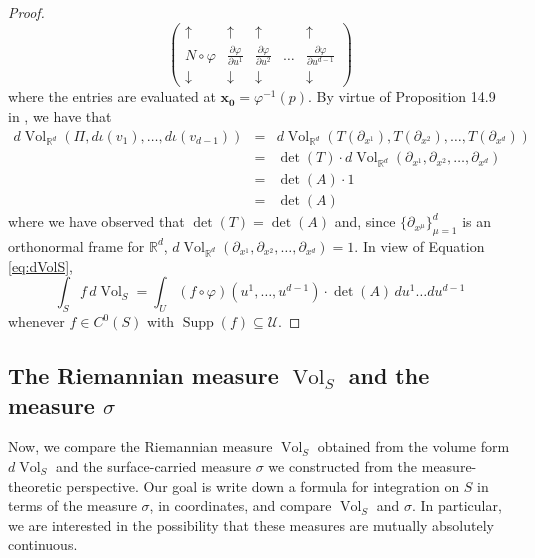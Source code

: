 \documentclass{article}
\newcommand\supp{\operatorname{Supp}}
\renewcommand\det{\operatorname{det}}
\newcommand{\p}{\partial}
\newcommand{\R}{\mathbb{R}}
\newcommand{\f}[2]{\frac{#1}{#2}}
\theoremstyle{theorem}
\newcommand{\Vol}{\operatorname{Vol}}
\begin{document}
\begin{proof}
\begin{equation*}
    \begin{pmatrix}
    \uparrow &\uparrow & \uparrow &   &\uparrow \\ 
    N \circ \varphi &\f{\p \varphi}{\p u^1}& \f{\p \varphi}{\p u^2}  &\dots&\f{\p \varphi}{\p u^{d-1}}\\
    \downarrow  &\downarrow  & \downarrow &    &\downarrow 
    \end{pmatrix}
\end{equation*}
where the entries are evaluated at $\mathbf{x_0}= \varphi^{-1}(p)$. By virtue of Proposition 14.9 in \cite{lee2013smooth}, we have that
\begin{eqnarray*}
    d\Vol_{\R^d}(\Pi, d\iota(v_1),\dots, d\iota(v_{d-1})) &=& d\Vol_{\R^d}(T(\p_{x^1}), T(\p_{x^2}),\dots, T(\p_{x^{d}})) \\
    &=& \det(T) \cdot d\Vol_{\R^d}(\p_{x^1}, \p_{x^2}, \dots, \p_{x^{d}}) \\ 
    &=& \det(A) \cdot 1 \\
    &=& \det(A)
\end{eqnarray*}
where we have observed that $\det(T) = \det(A)$ and, since $\{ \p_{x^\mu} \}_{\mu=1}^{d}$ is an orthonormal frame for $\R^d$, $d\Vol_{\R^d}(\partial_{x^1},\partial_{x^2},\dots,\partial_{x^d})=1$. In view of Equation \ref{eq:dVolS}, 
\begin{equation*}
\int_S f\,d\Vol_S=\int_U (f\circ \varphi)(u^1,\dots,u^{d-1}) \cdot \det(A) \, du^1\dots du^{d-1}
\end{equation*}
whenever $f\in C^0(S)$ with $\supp(f)\subseteq \mathcal{U}$.
\end{proof}



\subsection{The Riemannian measure $\Vol_S$ and the measure $\sigma$}

Now, we compare the Riemannian measure $\Vol_S$ obtained from the volume form $d\Vol_S$ and the surface-carried measure $\sigma$ we constructed from the measure-theoretic perspective. Our goal is write down a formula for integration on $S$ in terms of the measure $\sigma$, in coordinates, and compare $\Vol_S$ and $\sigma$. In particular, we are interested in the possibility that these measures are mutually absolutely continuous. \\
\end{document}
